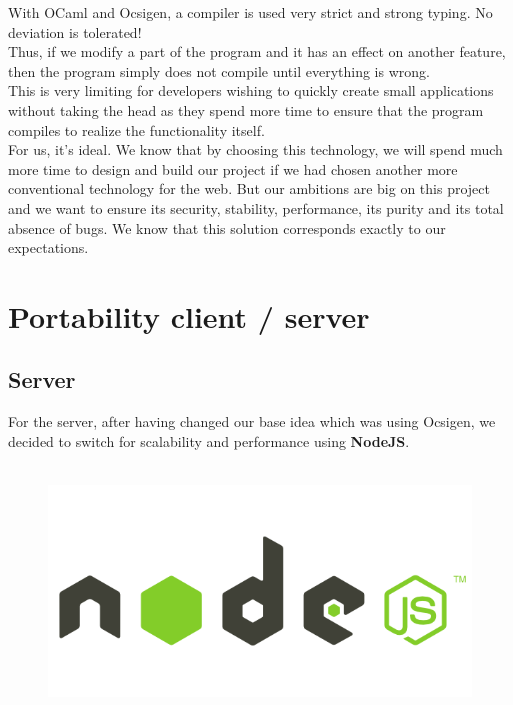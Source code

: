 \documentclass {life-en}
\begin{document}
\newpage

With OCaml and Ocsigen, a compiler is used very strict and strong typing. No deviation is tolerated!\\
Thus, if we modify a part of the program and it has an effect on another feature, then the program simply does not compile until everything is wrong.\\

This is very limiting for developers wishing to quickly create small applications without taking the head as they spend more time to ensure that the program compiles to realize the functionality itself.\\
For us, it's ideal. We know that by choosing this technology, we will spend much more time to design and build our project if we had chosen another more conventional technology for the web. But our ambitions are big on this project and we want to ensure its security, stability, performance, its purity and its total absence of bugs. We know that this solution corresponds exactly to our expectations.
\\

\section{Portability client / server}

\subsection{Server}

For the server, after having changed our base idea which was using Ocsigen, we decided to switch for scalability and performance using \textbf{NodeJS}.\\
\\


\begin{figure}[H]
  \begin{center}
    \includegraphics[width=13cm]{img/nodejs.png}
  \end{center}
\end{figure}
\end{document}
